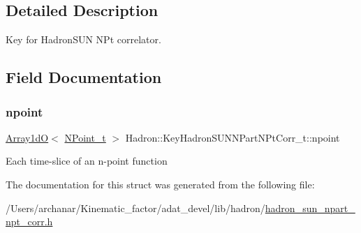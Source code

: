 \subsection{Detailed Description}
Key for Hadron\+S\+UN N\+Pt correlator. 

\subsection{Field Documentation}
\mbox{\label{structHadron_1_1KeyHadronSUNNPartNPtCorr__t_a1d5919dc89116837fc924188f3c604bc}} 
\subsubsection{\texorpdfstring{npoint}{npoint}}
{\footnotesize\ttfamily \mbox{\hyperlink{classADAT_1_1Array1dO}{Array1dO}}$<$ \mbox{\hyperlink{structHadron_1_1KeyHadronSUNNPartNPtCorr__t_1_1NPoint__t}{N\+Point\+\_\+t}} $>$ Hadron\+::\+Key\+Hadron\+S\+U\+N\+N\+Part\+N\+Pt\+Corr\+\_\+t\+::npoint}

Each time-\/slice of an n-\/point function 

The documentation for this struct was generated from the following file\+:\begin{DoxyCompactItemize}
\item 
/\+Users/archanar/\+Kinematic\+\_\+factor/adat\+\_\+devel/lib/hadron/\mbox{\hyperlink{lib_2hadron_2hadron__sun__npart__npt__corr_8h}{hadron\+\_\+sun\+\_\+npart\+\_\+npt\+\_\+corr.\+h}}\end{DoxyCompactItemize}
